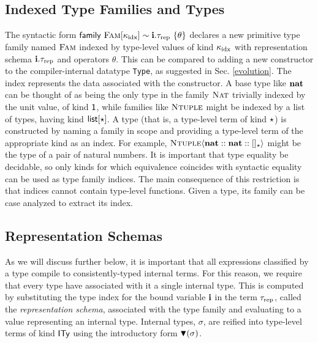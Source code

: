 \documentclass{llncs}
\begin{document}
\subsection{Indexed Type Families and Types}\label{families}
The syntactic form ${\sf family}~\textsc{Fam}[\kappa_{\text{idx}}]\sim {\textbf{i}}.{\tau_{\text{rep}}}~\{\theta\}$ declares a new primitive type family named $\textsc{Fam}$ indexed by type-level values of kind $\kappa_{\text{idx}}$ with representation schema ${\textbf{i}}.{\tau_{\text{rep}}}$ and operators $\theta$. This can be compared to adding a new constructor to the compiler-internal datatype \lstinline{Type}, as suggested in Sec. \ref{evolution}. 
The index represents the data associated with the constructor. A base type like ${\textbf{nat}}$ can be thought of as being the only type in the family $\textsc{Nat}$ trivially indexed by the unit value, of kind $\textsf{1}$, while families like $\textsc{Ntuple}$ might be indexed by a list of types, having kind $\textsf{list}[\star]$. 
A type (that is, a type-level term of kind $\star$) is constructed by naming a family in scope and providing a type-level term of the appropriate kind as an index. For example, $\textsc{Ntuple}\langle{\textbf{nat}} :: {\textbf{nat}} :: []_\star\rangle$ might be the type of a pair of natural numbers. It is important that type equality be decidable, so only kinds for which equivalence coincides with syntactic equality can be used as type family indices. The main  consequence of this restriction is that indices cannot contain type-level functions. Given a type, its family can be \textsf{case} analyzed to extract its index.

\subsection{Representation Schemas}
As we will discuss further below, it is important that all expressions classified by a type compile to consistently-typed internal terms. For this reason, we require that every type have associated with it a single internal type. This is computed by substituting the type index for the bound variable ${\textbf{i}}$ in the term ${\tau_{\text{rep}}}$, called the \emph{representation schema}, associated with the type family and evaluating to a value representing an internal type. Internal types, $\sigma$, are reified into type-level terms of kind $\textsf{ITy}$ using the introductory form $\blacktriangledown(\sigma)$.
\end{document}
